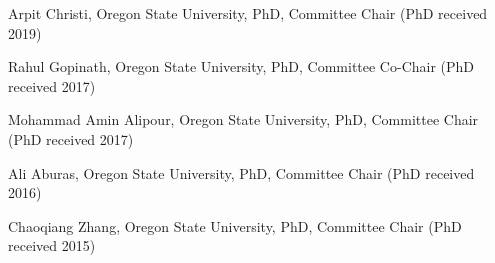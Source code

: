 \documentclass[ComputerScience]{vita}
\begin{document}
\begin{vita}
\begin{Advised Students Completing PhD in Computer Science}
\item Arpit Christi, Oregon State University, PhD, Committee Chair
  (PhD received 2019)  
\item Rahul Gopinath, Oregon State University, PhD, Committee Co-Chair
  (PhD received 2017)
\item Mohammad Amin Alipour, Oregon State University, PhD, Committee Chair (PhD received 2017)
\item Ali Aburas, Oregon State University, PhD, Committee Chair (PhD received 2016)
\item Chaoqiang Zhang, Oregon State University, PhD, Committee Chair (PhD received 2015)
\end{Advised Students Completing PhD in Computer Science}


\end{vita}
\end{document}
